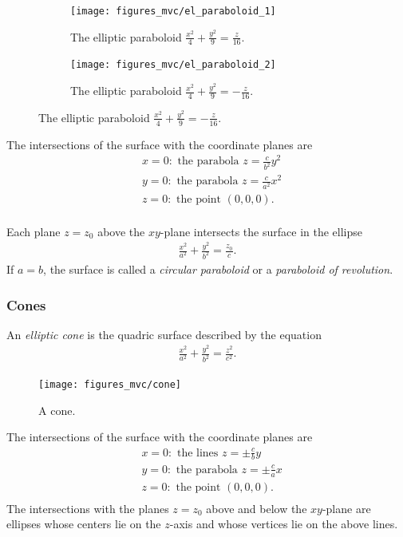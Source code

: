 \documentclass[12pt,letterpaper,reqno]{article}
\numberwithin{equation}{section}
\begin{document}
{\begin{figure}[h]
\centering
\begin{subfigure}{.5\textwidth}
  \centering
  \texttt{[image: figures\_mvc/el\_paraboloid\_1]}
  \caption{The elliptic paraboloid $\frac{x^2}{4}+\frac{y^2}{9}=\frac{z}{16}$.}
\end{subfigure}%
\begin{subfigure}{.5\textwidth}
  \centering
  \texttt{[image: figures\_mvc/el\_paraboloid\_2]}
  \caption{The elliptic paraboloid $\frac{x^2}{4}+\frac{y^2}{9}=-\frac{z}{16}$.}
\end{subfigure}
\end{figure}
The intersections of the surface with the coordinate planes are
\begin{align*}
	&x=0: \text{ the parabola } z=\frac{c}{b^2}y^2 \\
	&y=0: \text{ the parabola } z=\frac{c}{a^2}x^2 \\
	&z=0: \text{ the point } (0,0,0). \\
\end{align*}

Each plane $z=z_0$ above the $xy$-plane intersects the surface in the ellipse
\begin{align*}
	\frac{x^2}{a^2}+\frac{y^2}{b^2}=\frac{z_0}{c}.
\end{align*}
If $a=b$, the surface is called a \emph{circular paraboloid} or a \emph{paraboloid of revolution}.

\subsubsection{Cones}
\begin{defn}[Cone]
	An \emph{elliptic cone} is the quadric surface described by the equation
	\begin{align*}
		\frac{x^2}{a^2}+\frac{y^2}{b^2}=\frac{z^2}{c^2}.
	\end{align*}
\end{defn}

\begin{figure}[h]
	\begin{center}
		\texttt{[image: figures\_mvc/cone]}
	\end{center}
	\caption{A cone.}
\end{figure}

The intersections of the surface with the coordinate planes are
\begin{align*}
	&x=0: \text{ the lines } z=\pm \frac{c}{b}y \\
	&y=0: \text{ the parabola } z=\pm \frac{c}{a}x \\
	&z=0: \text{ the point } (0,0,0). \\
\end{align*}
The intersections with the planes $z=z_0$ above and below the $xy$-plane are ellipses whose centers lie on the $z$-axis and whose vertices lie on the above lines. 

}
\end{document}
